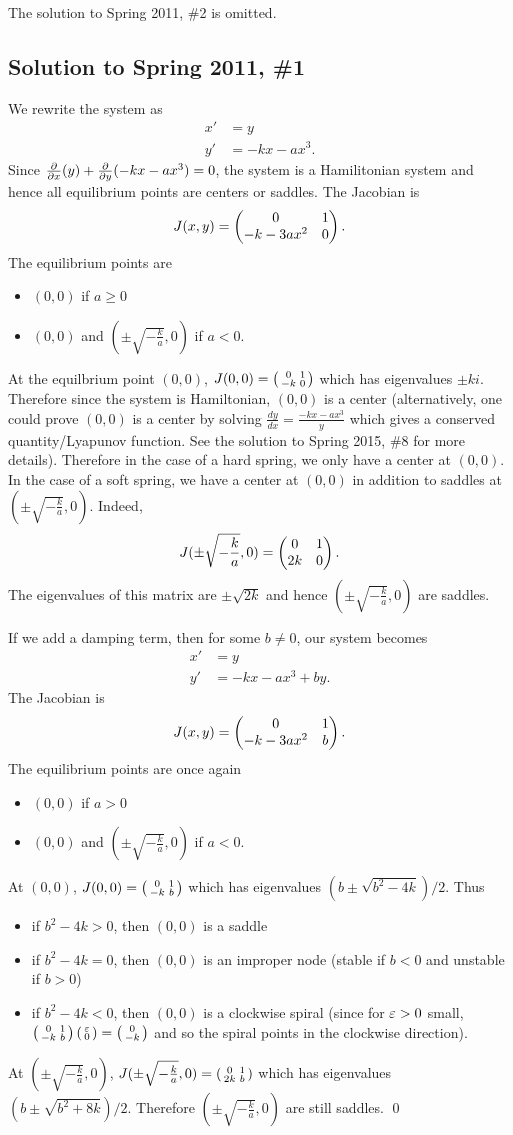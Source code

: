 \noindent The solution to Spring 2011, \#2 is omitted.

\subsection*{Solution to Spring 2011, \#1}\label{s111}
We rewrite the system as
\begin{align*}
x' &= y\\
y' &= -kx - ax^{3}.
\end{align*}
Since $\frac{\partial}{\partial x}(y) + \frac{\partial}{\partial y}(-kx - ax^{3}) = 0$, the system is a Hamilitonian
system and hence all equilibrium points are centers or saddles. The Jacobian is
$$J(x, y) = \begin{pmatrix} 0 & 1 \\ -k - 3ax^{2} & 0\end{pmatrix}.$$
The equilibrium points are
\begin{itemize}
\item $(0, 0)$ if $a \geq 0$
\item $(0, 0)$ and $(\pm \sqrt{-\frac{k}{a}}, 0)$ if $a < 0$.
\end{itemize}
At the equilbrium point $(0, 0)$, $J(0, 0) = \left(\begin{smallmatrix} 0 & 1 \\ -k & 0\end{smallmatrix}\right)$ which has eigenvalues
$\pm ki$. Therefore since the system is Hamiltonian, $(0, 0)$ is a center (alternatively,
one could prove $(0, 0)$ is a center by solving $\frac{dy}{dx} = \frac{-kx - ax^{3}}{y}$ which
gives a conserved quantity/Lyapunov function. See the solution to Spring 2015, \#8 for more
details). Therefore in the case of a hard spring, we only have a center at $(0, 0)$.
In the case of a soft spring, we have a center at $(0, 0)$ in addition to saddles at
$(\pm \sqrt{-\frac{k}{a}}, 0)$. Indeed,
$$J(\pm \sqrt{-\frac{k}{a}}, 0) = \begin{pmatrix} 0 & 1 \\ 2k & 0\end{pmatrix}.$$
The eigenvalues of this matrix are $\pm\sqrt{2k}$ and hence $(\pm\sqrt{-\frac{k}{a}}, 0)$
are saddles.

If we add a damping term, then for some $b \neq 0$, our system becomes
\begin{align*}
x' &= y\\
y' &= -kx - ax^{3} + by.
\end{align*}
The Jacobian is $$J(x, y) = \begin{pmatrix} 0 & 1 \\ -k - 3ax^{2} & b\end{pmatrix}.$$ The equilibrium points are once again
\begin{itemize}
\item $(0, 0)$ if $a > 0$
\item $(0, 0)$ and $(\pm \sqrt{-\frac{k}{a}}, 0)$ if $a < 0$.
\end{itemize}
At $(0, 0)$, $J(0, 0) = \left(\begin{smallmatrix} 0 & 1 \\ -k & b\end{smallmatrix}\right)$ which has eigenvalues
$(b \pm \sqrt{b^{2} - 4k})/2$. Thus
\begin{itemize}
\item if $b^{2} - 4k > 0$, then $(0, 0)$ is a saddle
\item if $b^{2} - 4k = 0$, then $(0, 0)$ is an improper node (stable if $b < 0$ and unstable if $b > 0$)
\item if $b^{2} - 4k < 0$, then $(0, 0)$ is a clockwise spiral (since for $\varepsilon > 0$ small, $\left(\begin{smallmatrix} 0 & 1 \\ -k & b\end{smallmatrix}\right)\left(\begin{smallmatrix} \varepsilon \\ 0\end{smallmatrix}\right) = \left(\begin{smallmatrix} 0 \\ -k\end{smallmatrix}\right)$ and so the spiral points in the clockwise
direction).
\end{itemize}
At $(\pm \sqrt{-\frac{k}{a}}, 0)$,
$J(\pm \sqrt{-\frac{k}{a}}, 0) = \left(\begin{smallmatrix} 0 & 1 \\ 2k & b\end{smallmatrix}\right)$ which has eigenvalues
$(b \pm \sqrt{b^{2} + 8k})/2$. Therefore $(\pm\sqrt{-\frac{k}{a}}, 0)$
are still saddles.
\hfill\qed

